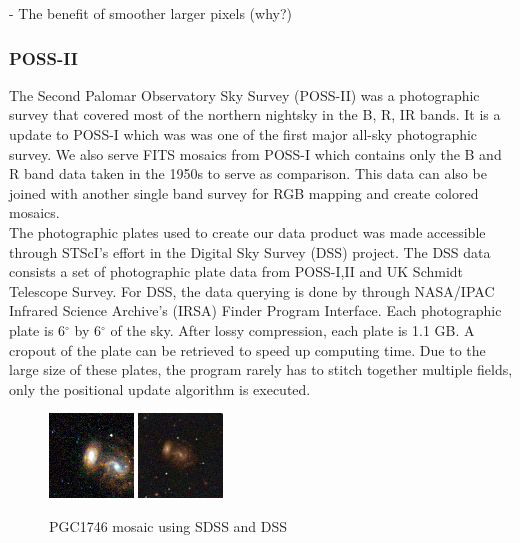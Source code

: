 \documentclass[5p]{elsarticle}
\begin{document}
 - The benefit of smoother larger pixels (why?)
	\subsubsection{POSS-II}
	The Second Palomar Observatory Sky Survey (POSS-II) was a photographic survey that covered most of the northern nightsky  in the B, R, IR bands. It is a update to POSS-I which was 	was one of the first major all-sky photographic survey. We also serve FITS mosaics from POSS-I which contains only the B and R band data taken in the 1950s to serve as comparison. This data can also be joined with another single band survey  for RGB mapping and create colored mosaics.
\\
\indent
	The photographic plates used to create our data product was made accessible through  STScI's effort in the Digital Sky Survey (DSS) project. The DSS data consists a set of  photographic plate data from POSS-I,II and UK Schmidt Telescope Survey. For DSS, the data querying is done by  through NASA/IPAC Infrared Science Archive's  (IRSA) Finder Program Interface. Each photographic plate is 6$^{\circ}$ by 6$^{\circ}$ of the sky. After lossy compression, each plate is 1.1 GB. A cropout of the plate  can be retrieved  to speed up computing time. Due to the large size of these plates, the program rarely has to stitch together multiple fields, only the positional update algorithm is executed.
\\
\indent 
\begin{figure}[h]
	\includegraphics[width=0.2\textwidth]{figures/SDSS_1746_LOW}
	\includegraphics[width=0.2\textwidth]{figures/DSS_1746_BEST}	
	\caption{PGC1746 mosaic using SDSS and DSS}
\end{figure}
\end{document}
